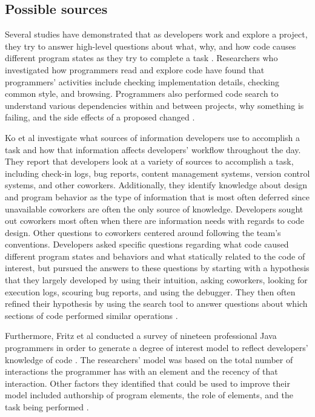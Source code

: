 \documentclass[12pt]{article}
\begin{document}
\subsection{Possible sources}

Several studies have demonstrated that as developers work and explore a project, they try to answer high-level questions about what, why, and how code causes different program states as they try to complete a task \cite{SadowskiEtAl2015, LaTozaMyers2010, LaTozaEtAl2007}. Researchers who investigated how programmers read and explore code have found that programmers' activities include checking implementation details, checking common style, and browsing. Programmers also performed code search to understand various dependencies within and between projects, why something is failing, and the side effects of a proposed changed \cite{SadowskiEtAl2015}. 

Ko et al investigate what sources of information developers use to accomplish a task and how that information affects developers' workflow throughout the day. They report that developers look at a variety of sources to accomplish a task, including check-in logs, bug reports, content management systems, version control systems, and other coworkers. Additionally, they identify knowledge about design and program behavior as the type of information that is most often deferred since unavailable coworkers are often the only source of knowledge. Developers sought out coworkers most often when there are information needs with regards to code design. Other questions to coworkers centered around following the team's conventions. Developers asked specific questions regarding what code caused different program states and behaviors and what statically related to the code of interest, but pursued the answers to these questions by starting with a hypothesis that they largely developed by using their intuition, asking coworkers, looking for execution logs, scouring bug reports, and using the debugger. They then often refined their hypothesis by using the search tool to answer questions about which sections of code performed similar operations \cite{KoEtAl2007}. 

Furthermore, Fritz et al conducted a survey of nineteen professional Java programmers in order to generate a degree of interest model to reflect developers' knowledge of code \cite{FritzEtAl2007}. The researchers' model was based on the total number of interactions the programmer has with an element and the recency of that interaction. Other factors they identified that could be used to improve their model included authorship of program elements, the role of elements, and the task being performed \cite{FritzEtAl2007}.
\end{document}
